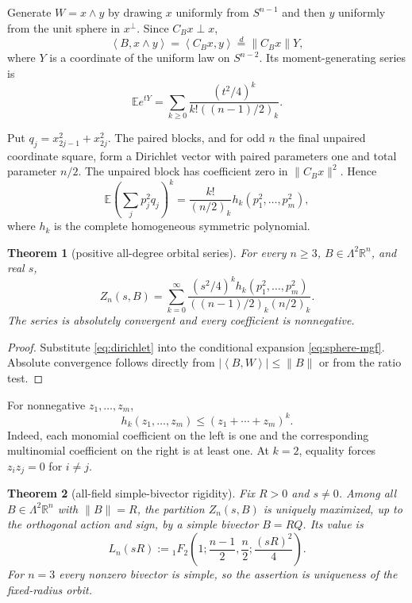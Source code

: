 \documentclass[11pt,a4paper]{article}
\newtheorem{theorem}{Theorem}[section]
\newcommand{\E}{\mathbb E}
\newcommand{\R}{\mathbb R}
\newcommand{\ip}[2]{\left\langle #1,#2\right\rangle}
\begin{document}
Generate $W=x\wedge y$ by drawing $x$ uniformly from $S^{n-1}$ and then $y$ uniformly from the unit sphere in $x^\perp$.  Since $C_Bx\perp x$,
\[
 \ip B{x\wedge y}=\ip{C_Bx}{y}
 \stackrel{d}{=}\|C_Bx\|Y,
\]
where $Y$ is a coordinate of the uniform law on $S^{n-2}$.  Its moment-generating series is
\begin{equation}\label{eq:sphere-mgf}
 \E e^{tY}=\sum_{k\ge0}\frac{(t^2/4)^k}{k!((n-1)/2)_k}.
\end{equation}

Put $q_j=x_{2j-1}^2+x_{2j}^2$.  The paired blocks, and for odd $n$ the final unpaired coordinate square, form a Dirichlet vector with paired parameters one and total parameter $n/2$.  The unpaired block has coefficient zero in $\|C_Bx\|^2$.  Hence
\begin{equation}\label{eq:dirichlet}
 \E\left(\sum_jp_j^2q_j\right)^k
 =\frac{k!}{(n/2)_k}h_k(p_1^2,\ldots,p_m^2),
\end{equation}
where $h_k$ is the complete homogeneous symmetric polynomial.

\begin{theorem}[positive all-degree orbital series]\label{thm:series}
For every $n\ge3$, $B\in\Lambda^2\R^n$, and real $s$,
\begin{equation}\label{eq:series}
 \boxed{
 Z_n(s,B)=\sum_{k=0}^{\infty}
 \frac{(s^2/4)^k h_k(p_1^2,\ldots,p_m^2)}
 {((n-1)/2)_k(n/2)_k}.}
\end{equation}
The series is absolutely convergent and every coefficient is nonnegative.
\end{theorem}

\begin{proof}
Substitute \cref{eq:dirichlet} into the conditional expansion \cref{eq:sphere-mgf}.  Absolute convergence follows directly from $|\ip BW|\le\|B\|$ or from the ratio test.
\end{proof}

For nonnegative $z_1,\ldots,z_m$,
\begin{equation}\label{eq:hkbound}
 h_k(z_1,\ldots,z_m)\le(z_1+\cdots+z_m)^k.
\end{equation}
Indeed, each monomial coefficient on the left is one and the corresponding multinomial coefficient on the right is at least one.  At $k=2$, equality forces $z_i z_j=0$ for $i\ne j$.

\begin{theorem}[all-field simple-bivector rigidity]\label{thm:allfield}
Fix $R>0$ and $s\ne0$.  Among all $B\in\Lambda^2\R^n$ with $\|B\|=R$, the partition $Z_n(s,B)$ is uniquely maximized, up to the orthogonal action and sign, by a simple bivector $B=RQ$.  Its value is
\begin{equation}\label{eq:Ln}
 L_n(sR):={}_1F_2\!\left(1;\frac{n-1}{2},\frac n2;\frac{(sR)^2}{4}\right).
\end{equation}
For $n=3$ every nonzero bivector is simple, so the assertion is uniqueness of the fixed-radius orbit.
\end{theorem}
\end{document}
